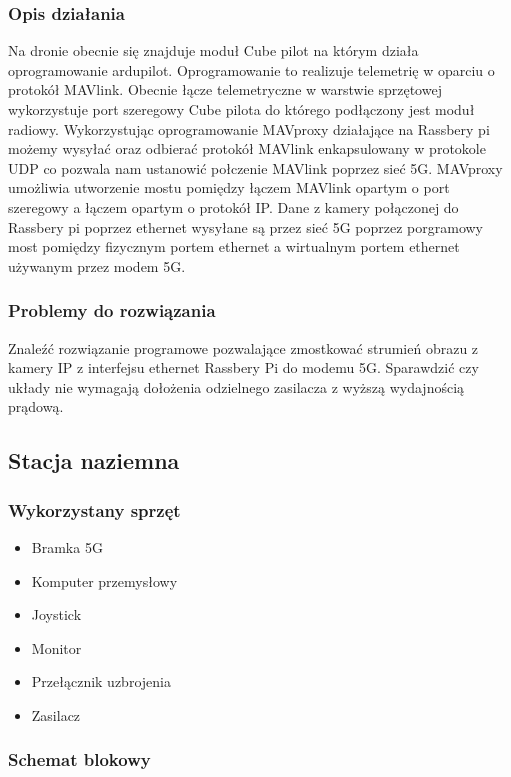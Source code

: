 \documentclass{article}
\begin{document}
\subsubsection{Opis działania}
Na dronie obecnie się znajduje moduł Cube pilot na którym działa oprogramowanie ardupilot. Oprogramowanie to realizuje telemetrię w oparciu o protokół MAVlink.
Obecnie łącze telemetryczne w warstwie sprzętowej wykorzystuje port szeregowy Cube pilota do którego podłączony jest moduł radiowy. Wykorzystując oprogramowanie 
MAVproxy działające na Rassbery pi możemy wysyłać oraz odbierać protokół MAVlink enkapsulowany w protokole UDP co pozwala nam ustanowić połczenie MAVlink poprzez sieć 5G.
MAVproxy umożliwia utworzenie mostu pomiędzy łączem MAVlink opartym o port szeregowy a łączem opartym o protokół IP. Dane z kamery połączonej do Rassbery pi poprzez ethernet 
wysyłane są przez sieć 5G poprzez porgramowy most pomiędzy fizycznym portem ethernet a wirtualnym portem ethernet używanym przez modem 5G.


\subsubsection{Problemy do rozwiązania}
Znaleźć rozwiązanie programowe pozwalające zmostkować strumień obrazu z kamery IP z interfejsu ethernet Rassbery Pi do modemu 5G.
Sparawdzić czy układy nie wymagają dołożenia odzielnego zasilacza z wyższą wydajnością prądową.

\subsection{Stacja naziemna}
\subsubsection{Wykorzystany sprzęt}
\begin{itemize}
    \item Bramka 5G
    \item Komputer przemysłowy
    \item Joystick
    \item Monitor
    \item Przełącznik uzbrojenia
    \item Zasilacz
\end{itemize}

\subsubsection{Schemat blokowy}
\end{document}
